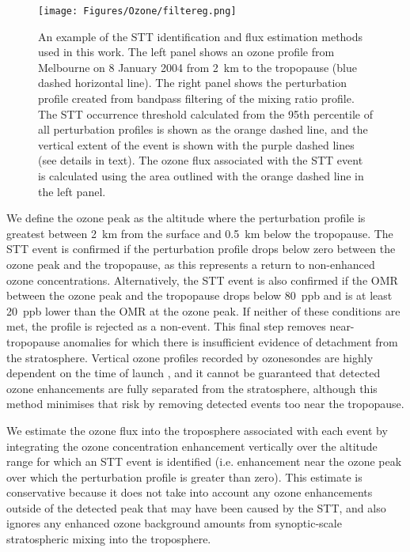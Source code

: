    \begin{figure}[t]
      \texttt{[image: Figures/Ozone/filtereg.png]}
      \caption{ %
        An example of the STT identification and flux estimation methods used in this work. 
        The left panel shows an ozone profile from Melbourne on 8 January 2004 from 2~km to the tropopause (blue dashed horizontal line).
        The right panel shows the perturbation profile created from bandpass filtering of the mixing ratio profile. The STT occurrence threshold calculated from the 95th percentile of all perturbation profiles is shown as the orange dashed line, and the vertical extent of the event is shown with the purple dashed lines (see details in text).
        The ozone flux associated with the STT event is calculated using the area outlined with the orange dashed line in the left panel.
      }
      \label{Ozone:fig:filterEG}
    \end{figure}
    
    We define the ozone peak as the altitude where the perturbation profile is greatest between 2~km from the surface and 0.5~km below the tropopause.
    The STT event is confirmed if the perturbation profile drops below zero between the ozone peak and the tropopause, as this represents a return to non-enhanced ozone concentrations.
    Alternatively, the STT event is also confirmed if the OMR between the ozone peak and the tropopause drops below 80~ppb and is at least 20~ppb lower than the OMR at the ozone peak. 
    If neither of these conditions are met, the profile is rejected as a non-event.
    This final step removes near-tropopause anomalies for which there is insufficient evidence of detachment from the stratosphere.
    Vertical ozone profiles recorded by ozonesondes are highly dependent on the time of launch \parencite{Sprenger2003}, and it cannot be guaranteed that detected ozone enhancements are fully separated from the stratosphere, although this method minimises that risk by removing detected events too near the tropopause.
    
    We estimate the ozone flux into the troposphere associated with each event by integrating the ozone concentration enhancement vertically over the altitude range for which an STT event is identified (i.e. enhancement near the ozone peak over which the perturbation profile is greater than zero).
    This estimate is conservative because it does not take into account any ozone enhancements outside of the detected peak that may have been caused by the STT, and also ignores any enhanced ozone background amounts from synoptic-scale stratospheric mixing into the troposphere.
    
